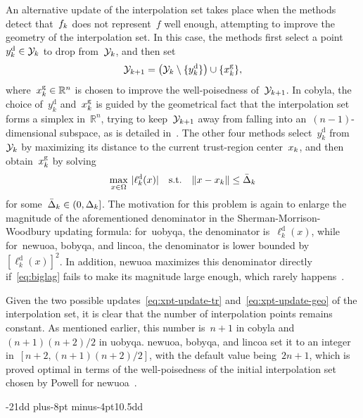 \documentclass[
    smallextended,  %
    final,          %
]{svjour3}
\makeatletter
\newcommand{\R}{\mathbb{R}}
\newcommand{\abs}[2][]{#1\lvert#2#1\rvert}
\newcommand{\drop}{{\text{d}}}
\newcommand{\fset}{\Omega}
\newcommand{\geo}{{\text{g}}}
\newcommand{\iter}[1][k]{x\ifthenelse{\equal{#1}{}}{}{_{#1}}}
\newcommand{\norm}[2][]{#1\lVert#2#1\rVert}
\newcommand{\objm}[1][k]{\obj\ifthenelse{\equal{#1}{}}{}{_{#1}}}
\newcommand{\obj}{f}
\newcommand{\radalt}[1][k]{\bar{\Delta}\ifthenelse{\equal{#1}{}}{}{_{#1}}}
\newcommand{\rad}[1][k]{\Delta\ifthenelse{\equal{#1}{}}{}{_{#1}}}
\newcommand{\set}[2][]{#1\{#2#1\}}
\newcommand{\st}{\text{s.t.}}
\newcommand{\xpt}[1][k]{\mathcal{Y}\ifthenelse{\equal{#1}{}}{}{_{#1}}}
\def\subsection{\@startsection{subsection}{2}{\z@}%
    {-21dd plus-8pt minus-4pt}{10.5dd}
     {\normalsize\bfseries}}
\makeatother
\begin{document}
An alternative update of the interpolation set takes place
when the methods detect that~$\objm$ does not represent~$\obj$ well enough, attempting
to improve the geometry of the interpolation set.
In this case, the methods first select a point~$y_k^{\drop} \in \xpt$ to drop from~$\xpt$, and then set
\begin{equation}
    \label{eq:xpt-update-geo}
    \xpt[k + 1] = \big(\xpt \setminus \set{y_k^{\drop}}\big) \cup \set{\iter^{\geo}},
\end{equation}
where~$\iter^{\geo} \in \R^n$ is chosen to improve the well-poisedness of~$\xpt[k + 1]$.
In \gls{cobyla}, the choice of~$y_k^{\drop}$ and~$\iter^{\geo}$ is guided by the geometrical fact
that the interpolation set forms a simplex in~$\R^n$, trying to keep~$\xpt[k+1]$ away from falling into
an~$(n-1)$-dimensional subspace, as is detailed in~\cite[equations~(15)--(17)]{Powell_1994}.
The other four methods select~$y_k^{\drop}$ from~$\xpt$ by maximizing its distance to
the current trust-region center~$\iter$, and then obtain~$\iter^{\geo}$ by solving
\begin{equation}
    \label{eq:biglag}
        \max_{x \in \fset}   ~\abs{\ell_k^{\drop}(x)} \quad \st \quad  \norm{x - \iter} \le \radalt
\end{equation}
for some~$\radalt \in (0, \rad]$.
The motivation for this problem is again to enlarge the magnitude of the
aforementioned denominator in the Sherman-Morrison-Woodbury updating formula:
for~\gls{uobyqa}, the denominator is~$\ell_k^{\drop}(x)$, while for~\gls{newuoa}, \gls{bobyqa},
and \gls{lincoa}, the denominator is lower bounded by~$[\ell_k^{\drop}(x)]^2$.
In addition, \gls{newuoa} maximizes this denominator directly if~\eqref{eq:biglag}
fails to make its magnitude large enough, which rarely happens~\cite[\S~6]{Powell_2006}.

Given the two possible updates~\eqref{eq:xpt-update-tr} and~\eqref{eq:xpt-update-geo} of the
interpolation set, it is clear that the number of interpolation points remains constant.
As mentioned earlier, this number is~$n+1$ in \gls{cobyla} and~$(n+1)(n+2)/2$ in \gls{uobyqa}.
\gls{newuoa}, \gls{bobyqa}, and \gls{lincoa} set it to an integer in~$[n+2, (n+1)(n+2)/2]$,
with the default value being~$2n+1$, which is proved optimal in terms of the well-poisedness of
the initial interpolation set chosen by Powell for \gls{newuoa}~\cite{Ragonneau_Zhang_2023a}.%


\subsection{}
\label{ssec:cobyla}
\end{document}
